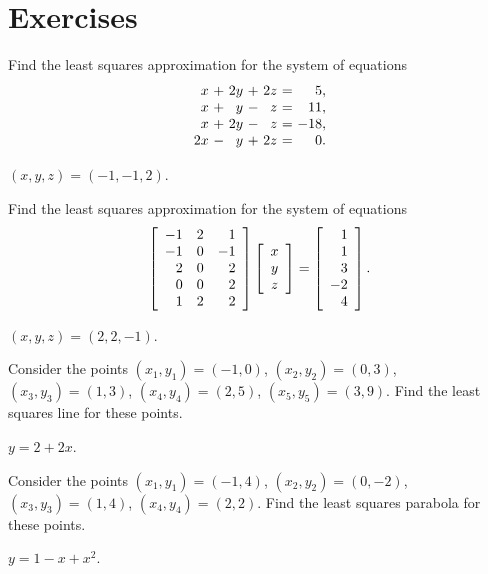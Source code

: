 \documentclass{ximera}
\author{Zack Reed}
\begin{document}
\section*{Exercises}

\begin{exercise}
  Find the least squares approximation for the system of equations
  \begin{equation*}
    \begin{array}{r@{~}c@{~}r@{~}c@{~}r@{~}c@{~}r}
       x &+& 2y &+& 2z &=&   5, \\
       x &+&  y &-&  z &=&  11, \\
       x &+& 2y &-&  z &=& -18, \\
      2x &-&  y &+& 2z &=&  0. \\
    \end{array}
  \end{equation*}
  \begin{solution}
    $(x,y,z) = (-1,-1,2)$.
  \end{solution}
\end{exercise}

\begin{exercise}
  Find the least squares approximation for the system of equations
  \begin{equation*}
    \startmat{rrr}
      -1 & 2 & 1 \\
      -1 & 0 & -1 \\
      2 & 0 & 2 \\
      0 & 0 & 2 \\
      1 & 2 & 2 \\
    \stopmat
    \startmat{c} x \\ y \\ z \stopmat
    =
    \startmat{r} 1 \\ 1 \\ 3 \\ -2 \\ 4 \stopmat.
  \end{equation*}
  \begin{solution}
    $(x,y,z) = (2,2,-1)$.
  \end{solution}
\end{exercise}

\begin{exercise}
  Consider the points $(x_1,y_1) = (-1,0)$, $(x_2,y_2) = (0,3)$,
  $(x_3,y_3) = (1,3)$, $(x_4,y_4) = (2,5)$, $(x_5,y_5) = (3,9)$.  Find
  the least squares line for these points.
  \begin{solution}
    $y = 2+2x$.
  \end{solution}
\end{exercise}

\begin{exercise}
  Consider the points $(x_1,y_1) = (-1,4)$, $(x_2,y_2) = (0,-2)$,
  $(x_3,y_3) = (1,4)$, $(x_4,y_4) = (2,2)$.  Find the least squares
  parabola for these points.
  \begin{solution}
    $y = 1-x+x^2$.
  \end{solution}
\end{exercise}
\end{document}
